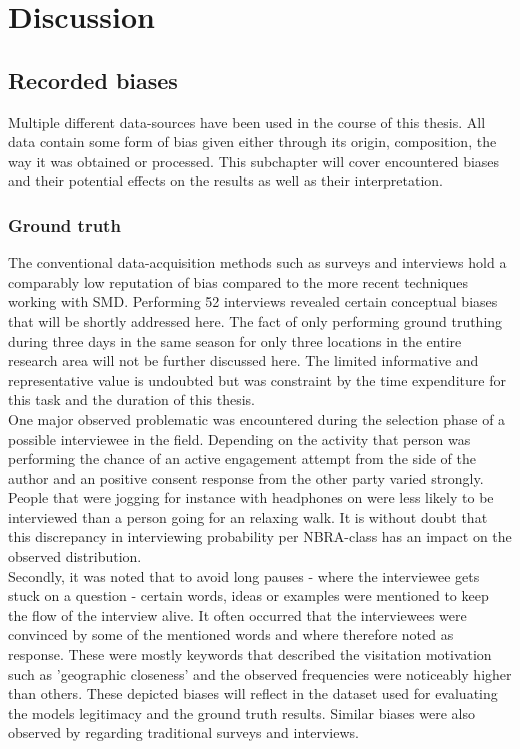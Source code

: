 \chapter{Discussion} \label{discussion}

\section*{Recorded biases}
Multiple different data-sources have been used in the course of this thesis. All data contain some form of bias given either through its origin, composition, the way it was obtained or processed. 
This subchapter will cover encountered biases and their potential effects on the results as well as their interpretation.

\subsection*{Ground truth}
The conventional data-acquisition methods such as surveys and interviews hold a comparably low reputation of bias compared to the more recent techniques working with SMD. Performing 52 interviews revealed certain conceptual biases that will be shortly addressed here. The fact of only performing ground truthing during three days in the same season for only three locations in the entire research area will not be further discussed here. The limited informative and representative value is undoubted but was constraint by the time expenditure for this task and the duration of this thesis. \\
\newline
One major observed problematic was encountered during the selection phase of a possible interviewee in the field. Depending on the activity that person was performing the chance of an active engagement attempt from the side of the author and an positive consent response from the other party varied strongly. People that were jogging for instance with headphones on were less likely to be interviewed than a person going for an relaxing walk. It is without doubt that this discrepancy in interviewing probability per NBRA-class has an impact on the observed distribution.\\
Secondly, it was noted that to avoid long pauses - where the interviewee gets stuck on a question - certain words, ideas or examples were mentioned to keep the flow of the interview alive. It often occurred that the interviewees were convinced by some of the mentioned words and where therefore noted as response. These were mostly keywords that described the visitation motivation such as 'geographic closeness' and the observed frequencies were noticeably higher than others. These depicted biases will reflect in the dataset used for evaluating the models legitimacy and the ground truth results. Similar biases were also observed by \parencite{Hanemann2011, Kling2012, Tenerelli2016} regarding traditional surveys and interviews.

